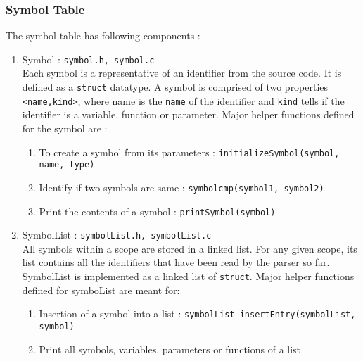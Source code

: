 \documentclass[12pt]{article}
\begin{document}
\subsubsection{Symbol Table}
The symbol table has following components :
\begin{enumerate}
\item Symbol : \texttt{symbol.h, symbol.c}
\\Each symbol is a representative of an identifier from the source code. It is defined as a \texttt{struct} datatype. A symbol is comprised of two properties \texttt{<name,kind>}, where name is the \texttt{name} of the identifier and \texttt{kind} tells if the identifier is a variable, function or parameter. Major helper functions defined for the symbol are :
\begin{enumerate}
\item To create a symbol from its parameters : \texttt{initializeSymbol(symbol, name, type)}
\item Identify if two symbols are same :  \texttt{symbolcmp(symbol1, symbol2)}
\item Print the contents of a symbol :   \texttt{printSymbol(symbol)}
\end{enumerate}

\item SymbolList : \texttt{symbolList.h, symbolList.c}
\\All symbols within a scope are stored in a linked list. For any given scope, its list contains all the identifiers that have been read by the parser so far. SymbolList is implemented as a linked list of \texttt{struct}. Major helper functions defined for symboList are meant for:
\begin{enumerate}
\item Insertion of a symbol into a list  : \texttt{symbolList\_insertEntry(symbolList, symbol)}
\item Print all symbols, variables, parameters or functions of a list
\end{enumerate}



\end{enumerate}
\end{document}
